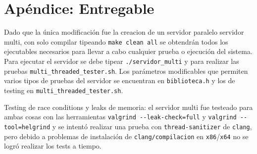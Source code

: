 \section{Ap\'endice: Entregable}
Dado que la \'unica modificaci\'on fue la creacion de un servidor paralelo servidor multi, con solo compilar tipeando \verb|make clean all| se obtendr\'an todos los ejecutables necesarios para llevar a cabo cualquier prueba o ejecuci\'on del sistema. Para ejecutar el servidor se debe tipear \verb|./servidor_multi| y para realizar las pruebas \verb|multi_threaded_tester.sh|. Los par\'ametros modificables que permiten varios tipos de pruebas del servidor se encuentran en \verb|biblioteca.h| y los de testing en \verb|multi_threaded_tester.sh|.

Testing de race conditions y leaks de memoria: el servidor multi fue testeado para ambas cosas con las herramientas \verb|valgrind --leak-check=full| y \verb|valgrind --tool=helgrind| y se intent\'o realizar una prueba con \verb|thread-sanitizer| de \verb|clang|, pero debido a problemas de instalaci\'on de \verb|clang/compilacion| en \verb|x86|/\verb|x64| no se logr\'o realizar los tests a tiempo.